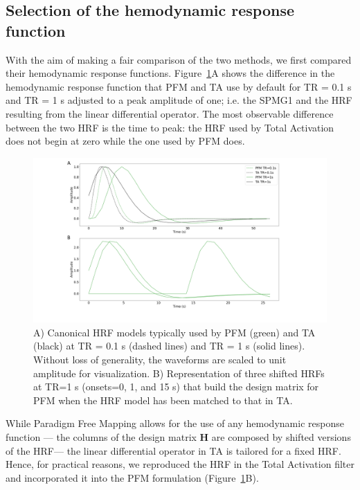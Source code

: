 \subsection{Selection of the hemodynamic response function}

With the aim of making a fair comparison of the two methods, we first compared their hemodynamic response functions. Figure~\ref{fig:hrf_diff}A shows the difference in the hemodynamic response function that PFM and TA use by default for TR = 0.1 s and TR = 1 s adjusted to a peak amplitude of one; i.e. the SPMG1 and the HRF resulting from the linear differential operator. The most observable difference between the two HRF is the time to peak: the HRF used by Total Activation does not begin at zero while the one used by PFM does.

\begin{figure}[h]
    \includegraphics[width=\columnwidth]{figures/pfm_ta_hrf.pdf}
    \caption{A) Canonical HRF models typically used by PFM (green) and TA (black) at TR = 0.1 s (dashed lines) and TR = 1 s (solid lines). Without loss of generality, the waveforms are scaled to unit amplitude for visualization. B) Representation of three shifted HRFs at TR=1 s (onsets=0, 1, and 15 s) that build the design matrix for PFM when the HRF model has been matched to that in TA.}
\label{fig:hrf_diff}
\end{figure}

While Paradigm Free Mapping allows for the use of any hemodynamic response function --- the columns of the design matrix \(\mathbf{H}\) are composed by shifted versions of the HRF--- the linear differential operator in TA is tailored for a fixed HRF. Hence, for practical reasons, we reproduced the HRF in the Total Activation filter and incorporated it into the PFM formulation (Figure~\ref{fig:hrf_diff}B).

